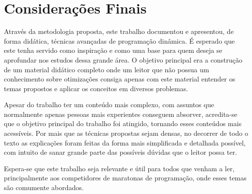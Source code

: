 \chapter{Considerações Finais}
\label{chap:conclusao}

Através da metodologia proposta, este trabalho documentou e apresentou, de forma didática, técnicas avançadas de programação dinâmica. É esperado que este tenha servido como inspiração e como uma base para quem deseja se aprofundar nos estudos dessa grande área. O objetivo principal era a construção de um material didático completo onde um leitor que não possua um conhecimento sobre otimizações consiga apenas com este material entender os temas propostos e aplicar os conceitos em diversos problemas.

Apesar do trabalho ter um conteúdo mais complexo, com assuntos que normalmente apenas pessoas mais experientes conseguem absorver, acredita-se que o objetivo principal do trabalho foi atingido, tornando esses conteúdos mais acessíveis. Por mais que as técnicas propostas sejam densas, no decorrer de todo o texto as explicações foram feitas da forma mais simplificada e detalhada possível, com intuito de sanar grande parte das possíveis dúvidas que o leitor possa ter.

Espera-se que este trabalho seja relevante e útil para todos que venham a ler, principalmente aos competidores de maratonas de programação, onde esses temas são comumente abordados.